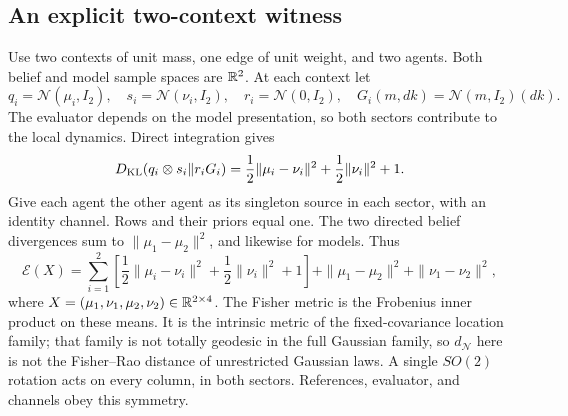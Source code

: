 \subsection{An explicit two-context witness}

Use two contexts of unit mass, one edge of unit weight, and two agents. Both belief and model sample spaces are $\mathbb R^2$. At each context let
\begin{equation}
 q_i=\mathcal N(\mu_i,I_2),\quad s_i=\mathcal N(\nu_i,I_2),\quad
 r_i=\mathcal N(0,I_2),\quad G_i(m,dk)=\mathcal N(m,I_2)(dk).
\end{equation}
The evaluator depends on the model presentation, so both sectors contribute to the local dynamics. Direct integration gives
\begin{equation}
 D_{\mathrm{KL}}(q_i\otimes s_i\Vert r_iG_i)
 =\frac12\|\mu_i-\nu_i\|^2+\frac12\|\nu_i\|^2+1.
\end{equation}
Give each agent the other agent as its singleton source in each sector, with an identity channel. Rows and their priors equal one. The two directed belief divergences sum to $\|\mu_1-\mu_2\|^2$, and likewise for models. Thus
\begin{equation}
 \mathcal E(X)=\sum_{i=1}^2\left[
 \frac12\|\mu_i-\nu_i\|^2+\frac12\|\nu_i\|^2+1\right]
 +\|\mu_1-\mu_2\|^2+\|\nu_1-\nu_2\|^2,
 \label{ctx:f:eq:examplelocal}
\end{equation}
where $X=(\mu_1,\nu_1,\mu_2,\nu_2)\in\mathbb R^{2\times4}$. The Fisher metric is the Frobenius inner product on these means. It is the intrinsic metric of the fixed-covariance location family; that family is not totally geodesic in the full Gaussian family, so $d_{\mathcal N}$ here is not the Fisher--Rao distance of unrestricted Gaussian laws. A single $SO(2)$ rotation acts on every column, in both sectors. References, evaluator, and channels obey this symmetry.

